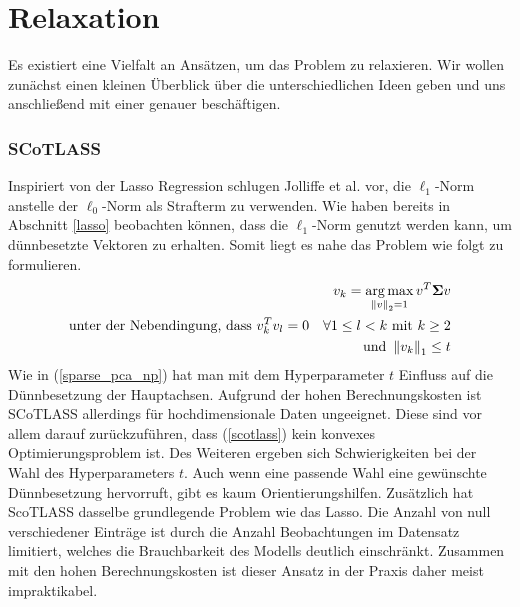 

\section{Relaxation}
\label{relaxation}

Es existiert eine Vielfalt an Ansätzen, um das Problem zu relaxieren. Wir wollen zunächst einen kleinen Überblick über die unterschiedlichen Ideen geben und uns anschließend mit einer genauer beschäftigen. 

\subsubsection{SCoTLASS}

Inspiriert von der Lasso Regression \cite{tibshirani_lasso} schlugen Jolliffe et al. \cite{scotlass} vor, die $\ell_1$-Norm anstelle der $\ell_0$-Norm als Strafterm zu verwenden. Wie haben bereits in Abschnitt \ref{lasso} beobachten können, dass die $\ell_1$-Norm genutzt werden kann, um dünnbesetzte Vektoren zu erhalten. Somit liegt es nahe das Problem wie folgt zu formulieren.
\begin{gather}
\label{scotlass}
\begin{split}
v_{k} = \operatorname*{arg\,max}_{\left\lVert v \right\rVert_2 = 1} v^{T}\mathbf{\Sigma} v\\
\text{unter der Nebendingung, dass } v_{k}^Tv_{l} = 0 \quad \forall 1 \leq l < k \text{ mit } k\geq 2\\
\text{und } \left\lVert v_{k} \right\rVert_1 \leq t 
\end{split}
\end{gather}
Wie in (\ref{sparse_pca_np}) hat man mit dem Hyperparameter $t$ Einfluss auf die Dünnbesetzung der Hauptachsen. Aufgrund der hohen Berechnungskosten ist SCoTLASS allerdings für hochdimensionale Daten ungeeignet. Diese sind vor allem darauf zurückzuführen, dass (\ref{scotlass}) kein konvexes Optimierungsproblem ist. Des Weiteren ergeben sich Schwierigkeiten bei der Wahl des Hyperparameters $t$. Auch wenn eine passende Wahl eine gewünschte Dünnbesetzung hervorruft, gibt es kaum Orientierungshilfen. Zusätzlich hat ScoTLASS dasselbe grundlegende Problem wie das Lasso. Die Anzahl von null verschiedener Einträge ist durch die Anzahl Beobachtungen im Datensatz limitiert, welches die Brauchbarkeit des Modells deutlich einschränkt. Zusammen mit den hohen Berechnungskosten ist dieser Ansatz in der Praxis daher meist impraktikabel.

